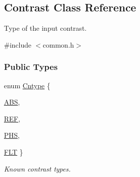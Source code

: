 \hypertarget{classContrast}{
\subsection{Contrast Class Reference}
\label{classContrast}
}


Type of the input contrast.  




{\ttfamily \#include $<$common.h$>$}

\subsubsection*{Public Types}
\begin{DoxyCompactItemize}
\item 
enum \hyperlink{classContrast_a99b7c9b3f4f10b92a6db24002adac72f}{Cntype} \{ \par
\hyperlink{classContrast_a99b7c9b3f4f10b92a6db24002adac72fa81734a45711f288f6c5e7f54bcbbffbb}{ABS}, 
\par
\hyperlink{classContrast_a99b7c9b3f4f10b92a6db24002adac72faf34254288d1ad4c4847bf6dec827b603}{REF}, 
\par
\hyperlink{classContrast_a99b7c9b3f4f10b92a6db24002adac72fa1b525c7d8fa77ecc38d32957bdbb2a77}{PHS}, 
\par
\hyperlink{classContrast_a99b7c9b3f4f10b92a6db24002adac72fa1d6ff103864450064c6bba77f807fa50}{FLT}
 \}
\begin{DoxyCompactList}\small\item\em Known contrast types. \item\end{DoxyCompactList}\end{DoxyCompactItemize}
